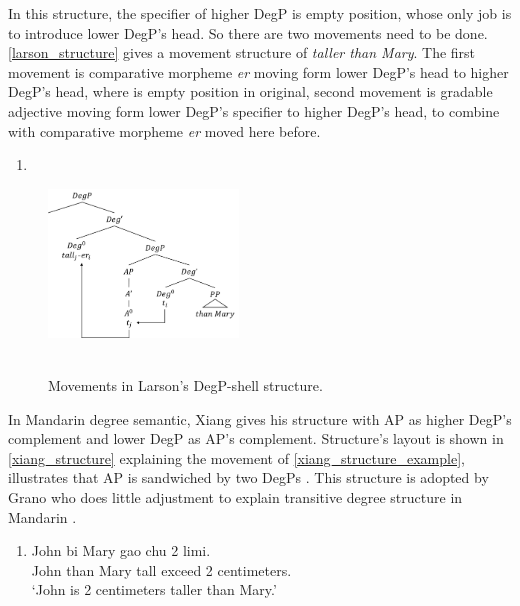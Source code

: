 \documentclass{ctexart}
\let \cite \parencite
\begin{document}
In this structure, the specifier of higher DegP is empty position, whose only job is to introduce lower DegP's head. So there are two movements need to be done. \ref{larson_structure} gives a movement structure of \textit{taller than Mary}. The first movement is comparative morpheme \textit{er} moving form lower DegP's head to higher DegP's head, where is empty position in original, second movement is gradable adjective moving form lower DegP's specifier to higher DegP's head, to combine with comparative morpheme \textit{er} moved here before.

\begin{enumerate}
    \item \label{larson_structure}
\end{enumerate}

\begin{figure}[H]
    \centering
    \includegraphics[width=0.45\textwidth]{pic/larson1.png}
    \begin{caption}
        \\ \vspace{-1.1ex}
        Movements in Larson's DegP-shell structure.
    \end{caption}
\end{figure}

In Mandarin degree semantic, Xiang gives his structure with AP as higher DegP's complement and lower DegP as AP's complement. Structure's layout is shown in \ref{xiang_structure} explaining the movement of \ref{xiang_structure_example}, illustrates that AP is sandwiched by two DegPs \cite{xiang2005}. This structure is adopted by Grano who does little adjustment to explain transitive degree structure in Mandarin \cite{grano2012}. 

\begin{enumerate}
    \item \label{xiang_structure_example}
    John bi Mary gao chu 2 limi.  \\
    John than Mary tall exceed 2 centimeters. \\
    `John is 2 centimeters taller than Mary.'
\end{enumerate}
\end{document}
